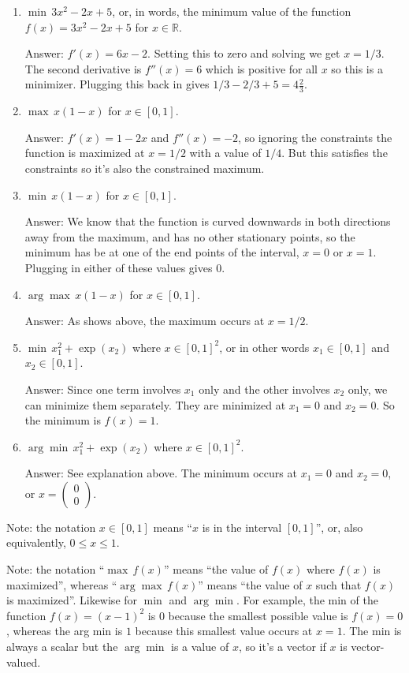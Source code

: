 \documentclass{article}
\def\ans#1{\par\gre{Answer: #1}}
\def\gre#1{{\color{gre}#1}}
\def\R{\mathbb{R}}
\begin{document}
	\begin{enumerate}
		\item $\min \, 3x^2-2x+5$, or, in words, the minimum value of the function $f(x) = 3x^2 -2x + 5$ for $x \in \R$.
		\ans{$f'(x) = 6x - 2$. Setting this to zero and solving we get $x = 1/3$. The second derivative is $f''(x) = 6$ which is positive for all $x$ so this is a minimizer. Plugging this back in gives $1/3 - 2/3 + 5 = 4\frac{2}{3}$.}
		\item $\max \, x(1-x)$ for $x\in [0,1]$.
		\ans{$f'(x) = 1 - 2x$ and $f''(x) = -2$, so ignoring the constraints the function is maximized at $x=1/2$ with a value of $1/4$. But this satisfies the constraints so it's also the constrained maximum.}
		\item $\min \, x(1-x)$ for $x\in [0,1]$.
		\ans{We know that the function is curved downwards in both directions away from the maximum, and has no other stationary points, so the minimum has be at one of the end points of the interval, $x = 0$ or $x=1$. Plugging in either of these values gives $0$.}
		\item $\arg \max \, x(1-x)$ for $x\in[0,1]$. 
		\ans{As shows above, the maximum occurs at $x=1/2$.}
		\item $\min \, x_1^2 + \exp(x_2)$ where $x \in [0,1]^2$, or in other words $x_1\in [0,1]$ and $x_2\in [0,1]$.
		\ans{Since one term involves $x_1$ only and the other involves $x_2$ only, we can minimize them separately. They are minimized at $x_1=0$ and $x_2=0$. So the minimum is $f(x)=1$.}
		\item $\arg \min \, x_1^2 + \exp(x_2)$ where $x \in [0,1]^2$. 
		\ans{See explanation above. The minimum occurs at $x_1=0$ and $x_2=0$, or $x=\begin{pmatrix}0 \\ 0 \end{pmatrix}$.}
	\end{enumerate}
	
	Note: the notation $x\in [0,1]$ means ``$x$ is in the interval $[0,1]$'', or, also equivalently, $0 \leq x \leq 1$.
	
	Note: the notation ``$\max \, f(x)$'' means ``the value of $f(x)$ where $f(x)$ is maximized'', whereas ``$\arg \max \, f(x)$'' means ``the value of $x$ such that $f(x)$ is maximized''.
	Likewise for $\min$ and $\arg \min$. For example, the min of the function $f(x)=(x-1)^2$ is $0$ because the smallest possible value is $f(x)=0$, 
	whereas the arg min is $1$ because this smallest value occurs at $x=1$. The min is always a scalar but the $\arg \min$ is a value of $x$, so it's a vector 
	if $x$ is vector-valued.
	
\end{document}
